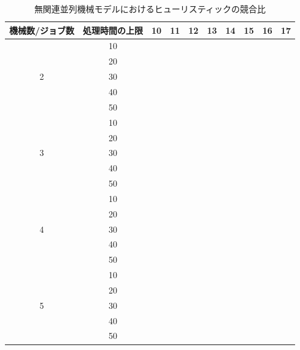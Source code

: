 \documentclass[12pt]{optlab-bachelor}
\begin{document}
\begin{table}[htb]
  \begin{center}
    \begin{tabular}{|c|c|c|c|c|c|c|c|c|c|} \hline
      機械数/ジョブ数 & 処理時間の上限 & 10 & 11 & 12 & 13 & 14 & 15 & 16 & 17 \\ \hline \hline
      & 10 &  &  &  &  &  &  &  &  \\ \cline{2-10}
      & 20 &  &  &  &  &  &  &  &  \\ \cline{2-10}
      2 & 30 &  &  &  &  &  &  &  &  \\ \cline{2-10}
      & 40 &  &  &  &  &  &  &  &  \\ \cline{2-10}
      & 50 &  &  &  &  &  &  &  &  \\ \hline \hline
      & 10 &  &  &  &  &  &  &  &  \\ \cline{2-10}
      & 20 &  &  &  &  &  &  &  &  \\ \cline{2-10}
      3 & 30 &  &  &  &  &  &  &  &  \\ \cline{2-10}
      & 40 &  &  &  &  &  &  &  &  \\ \cline{2-10}
      & 50 &  &  &  &  &  &  &  &  \\ \hline \hline
      & 10 &  &  &  &  &  &  &  & \\ \cline{2-10}
      & 20 &  &  &  &  &  &  &  &  \\ \cline{2-10}
      4 & 30 &  &  &  &  &  &  &  &  \\ \cline{2-10}
      & 40 &  &  &  &  &  &  &  &  \\ \cline{2-10}
      & 50 &  &  &  &  &  &  &  &  \\ \hline \hline
      & 10 &  &  &  &  &  &  &  &  \\ \cline{2-10}
      & 20 &  &  &  &  &  &  &  &  \\ \cline{2-10}
      5 & 30 &  &  &  &  &  &  &  &  \\ \cline{2-10}
      & 40 &  &  &  &  &  &  &  &  \\ \cline{2-10}
      & 50 &  &  &  &  &  &  &  &  \\ \hline \hline
    \end{tabular}
    \caption{無関連並列機械モデルにおけるヒューリスティックの競合比}
  \end{center}
\end{table}
\end{document}
